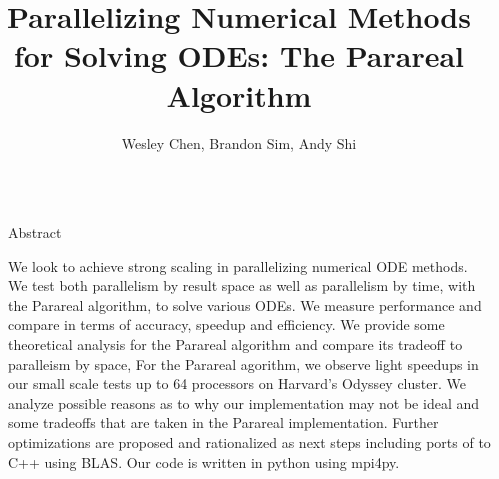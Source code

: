 \documentclass[final]{beamer}
\title{Parallelizing Numerical Methods for Solving ODEs: The Parareal Algorithm} %
\author{Wesley Chen, Brandon Sim, Andy Shi} %
\institute{Harvard University, Applied Math 205 Final Project} %
\newlength{\sepwid}
\newlength{\onecolwid}
\begin{document}

\setlength{\belowcaptionskip}{2ex} %
\setlength\belowdisplayshortskip{2ex} %

\begin{frame}[t] %

\begin{columns}[t] %

\begin{column}{\sepwid}\end{column} %

\begin{column}{\onecolwid} %


\begin{alertblock}{Abstract}

We look to achieve strong scaling in parallelizing numerical ODE methods. We test both parallelism by result space as well as parallelism by time, with the Parareal algorithm, to solve various ODEs.  We measure performance and compare in
terms of accuracy, speedup and efficiency. We provide some theoretical analysis for the Parareal algorithm and compare its tradeoff to paralleism by space, For the Parareal agorithm, we observe
light speedups in our small scale tests up to 64 processors on Harvard's
Odyssey cluster. We analyze possible reasons as to why our implementation
may not be ideal and some tradeoffs that are taken in the Parareal
implementation. Further optimizations are proposed and rationalized as next
steps including ports of to C++ using BLAS. Our code is written in python using mpi4py.

\end{alertblock}



\end{column}
\end{columns}
\end{frame}
\end{document}

